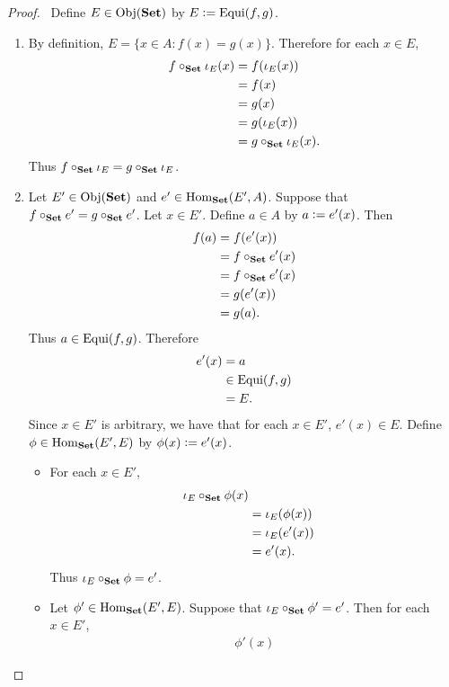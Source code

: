\documentclass{book}
\begin{document}
	\begin{proof}\
		Define $E \in \operatorname{Obj}(\text{\textbf{Set}})$ by $E \vcentcolon= \operatorname{Equi}(f,g)$.
		\begin{enumerate}
			\item By definition, $E = \{x \in A: f(x) = g(x)\}$. Therefore for each $x \in E$,
			\begin{align*}
				f \circ_{\text{\textbf{Set}}} \iota_E(x)
				& = f(\iota_E(x)) \\
				& = f(x) \\
				& = g(x) \\
				& = g(\iota_E(x)) \\
				& = g \circ_{\text{\textbf{Set}}} \iota_E (x).
			\end{align*}
			Thus $f \circ_{\text{\textbf{Set}}} \iota_E = g \circ_{\text{\textbf{Set}}} \iota_E$. 
			\item Let $E' \in \operatorname{Obj}(\text{\textbf{Set}})$ and $e' \in \operatorname{Hom}_{\text{\textbf{Set}}}(E',A)$. Suppose that $f \circ_{\text{\textbf{Set}}} e' = g \circ_{\text{\textbf{Set}}} e'$. Let $x \in E'$. Define $a \in A$ by $a \vcentcolon= e'(x)$. Then 
			\begin{align*}
				f(a)
				& = f(e'(x)) \\
				& = f \circ_{\text{\textbf{Set}}} e'(x) \\
				& = f \circ_{\text{\textbf{Set}}} e'(x) \\
				& = g(e'(x)) \\
				& = g(a).
			\end{align*}
			Thus $a \in \operatorname{Equi}(f,g)$. Therefore
			\begin{align*}
				e'(x)
				& = a \\
				& \in \operatorname{Equi}(f,g) \\
				& = E.
			\end{align*}
			Since $x \in E'$ is arbitrary, we have that for each $x \in E'$, $e'(x) \in E$.
			Define $\phi \in \operatorname{Hom}_{\text{\textbf{Set}}}(E', E)$ by $\phi(x) \vcentcolon= e'(x)$. 
			\begin{itemize}
				\item For each $x \in E'$,
				\begin{align*}
					\iota_E \circ_{\text{\textbf{Set}}} \phi(x) \\
					& = \iota_E(\phi(x)) \\
					& = \iota_E (e'(x)) \\
					& = e'(x).
				\end{align*}
				Thus $\iota_E \circ_{\text{\textbf{Set}}} \phi = e'$.
				\item Let $\phi' \in \operatorname{Hom}_{\text{\textbf{Set}}}(E', E)$. Suppose that $\iota_E \circ_{\text{\textbf{Set}}} \phi' = e'$. Then for each $x \in E'$,
				\begin{align*}
					\phi'(x)

\end{align*}
\end{itemize}
\end{enumerate}
\end{proof}
\end{document}
